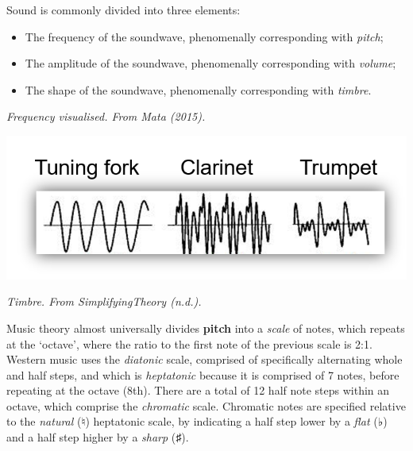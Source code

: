 
\noindent Sound is commonly divided into three elements:

\begin{itemize}
\item   The frequency of the soundwave, phenomenally corresponding with \textit{pitch}; 

\item   The amplitude of the soundwave, phenomenally corresponding with \textit{volume};

\item   The shape of the soundwave, phenomenally corresponding with \textit{timbre}.

\end{itemize}


{\it \footnotesize Frequency visualised. From Mata (2015).}

\quad

\includegraphics[scale=0.4]{./Images/Timbre.jpeg}

{\it \footnotesize Timbre. From SimplifyingTheory (n.d.).}


Music theory almost universally divides \textbf{pitch} into a \textit{scale}  of notes, which repeats at the ‘octave’, where the ratio to the first note of the previous scale is 2:1. Western music uses the \textit{diatonic} scale, comprised of specifically alternating whole and half steps, and which is \textit{heptatonic} because it is comprised of 7 notes, before repeating at the octave (8th). There are a total of 12 half note steps within an octave, which comprise the \textit{chromatic} scale. Chromatic notes are specified relative to the \textit{natural} (♮) heptatonic scale, by indicating a half step lower by a \textit{flat} (♭) and a half step higher by a \textit{sharp}  (♯). 


\begin{figure}
\end{figure}

